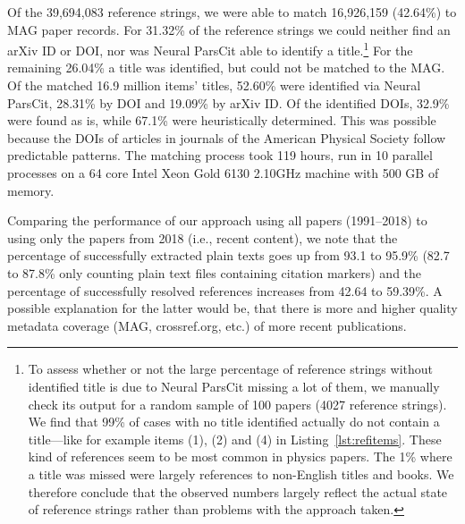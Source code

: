 Of the 39,694,083 reference strings, we were able to match 16,926,159 (42.64\%) to MAG paper records. For 31.32\% of the reference strings we could neither find an arXiv ID or DOI, nor was Neural ParsCit able to identify a title.\footnote{To assess whether or not the large percentage of reference strings without identified title is due to Neural ParsCit missing a lot of them, we manually check its output for a random sample of 100 papers (4027 reference strings). We find that 99\% of cases with no title identified actually do not contain a title---like for example items (1), (2) and (4) in Listing~\ref{lst:refitems}. These kind of references seem to be most common in physics papers. The 1\% where a title was missed were largely references to non-English titles and books. We therefore conclude that the observed numbers largely reflect the actual state of reference strings rather than problems with the approach taken.} For the remaining 26.04\% a title was identified, but could not be matched to the MAG.
Of the matched 16.9 million items' titles, 52.60\% were identified via Neural ParsCit, 28.31\% by DOI and 19.09\% by arXiv ID. Of the identified DOIs, 32.9\% were found as is, while 67.1\% were heuristically determined. This was possible because the DOIs of articles in journals of the American Physical Society follow predictable patterns. The matching process took 119 hours, run in 10 parallel processes on a 64 core Intel Xeon Gold 6130 2.10GHz machine with 500 GB of memory.

Comparing the performance of our approach using all papers (1991--2018) to using only the papers from 2018 (i.e., recent content), we note that the percentage of successfully extracted plain texts goes up from 93.1 to 95.9\% (82.7 to 87.8\% only counting plain text files containing citation markers) and the percentage of successfully resolved references increases from 42.64 to 59.39\%. A possible explanation for the latter would be, that there is more and higher quality metadata coverage (MAG, crossref.org, etc.) of more recent publications.

